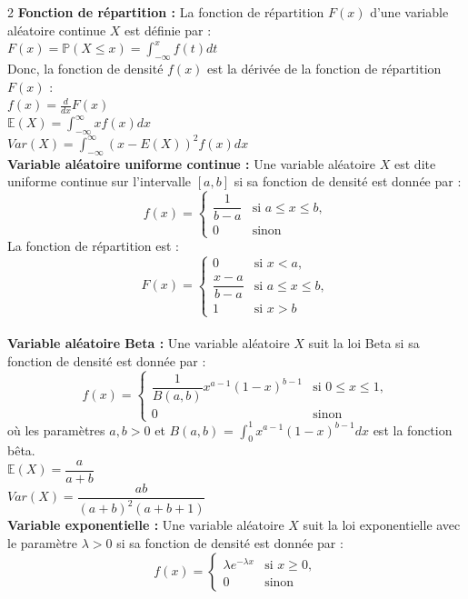 \documentclass[11pt]{article}
\begin{document}
\begin{multicols}{2}
  \textbf{Fonction de répartition :} La fonction de répartition $F(x)$ d'une variable aléatoire continue $X$ est définie par : \\
  $F(x) = \mathbb{P}(X \leq x) = \int_{-\infty}^{x} f(t) dt$ \\
  Donc, la fonction de densité $f(x)$ est la dérivée de la fonction de répartition $F(x)$ : \\
  $f(x) = \frac{d}{dx} F(x)$ \\
  
  $\mathbb{E}(X) = \int_{-\infty}^{\infty} x f(x) dx$ \\
  $Var(X) = \int_{-\infty}^{\infty} (x - E(X))^2 f(x) dx$ \\


  \textbf{Variable aléatoire uniforme continue :} Une variable aléatoire $X$ est dite uniforme continue sur l'intervalle $[a, b]$ si sa fonction de densité est donnée par : \\
  \[
  f(x) =
  \begin{cases}
    \dfrac{1}{b - a} & \text{si } a \leq x \leq b, \\
    0 & \text{sinon}
  \end{cases}
  \]
  La fonction de répartition est : \\
  \[
  F(x) =
  \begin{cases}
    0 & \text{si } x < a, \\
    \dfrac{x - a}{b - a} & \text{si } a \leq x \leq b, \\
    1 & \text{si } x > b
  \end{cases}
  \] \\


  \textbf{Variable aléatoire Beta :} Une variable aléatoire $X$ suit la loi Beta si sa fonction de densité est donnée par : \\
  \[
  f(x) =
  \begin{cases}
    \dfrac{1}{B(a, b)} x^{a-1} (1-x)^{b-1} & \text{si } 0 \leq x \leq 1, \\
    0 & \text{sinon}
  \end{cases}
  \]
  où les paramètres $a, b > 0$ et $B(a, b)$ = $\int_{0}^{1} x^{a-1} (1-x)^{b-1} dx$ est la fonction bêta. \\

  $\mathbb{E}(X) = \dfrac{a}{a + b}$ \\
  $Var(X) = \dfrac{ab}{(a + b)^2 (a + b + 1)}$ \\


  \textbf{Variable exponentielle :} Une variable aléatoire $X$ suit la loi exponentielle avec le paramètre $\lambda > 0$ si sa fonction de densité est donnée par : \\
  \[
  f(x) =
  \begin{cases}
    \lambda e^{-\lambda x} & \text{si } x \geq 0, \\
    0 & \text{sinon}
  \end{cases}
  \]


\end{multicols}
\end{document}
